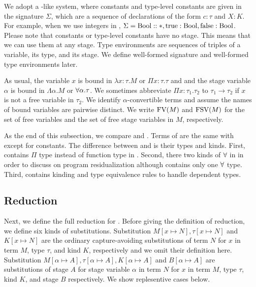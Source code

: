 
We adopt a \LLF-like system, where constants and type-level constants are given in the signature $\Sigma$, which
are a sequence of declarations of the form $c:\tau$ and $X:K$.
For example, when we use integers in \LMD, $\Sigma = \textrm{Bool} :: *, \textrm{true}:\textrm{Bool}, \textrm{false}:\textrm{Bool}$.
Please note that constants or type-level constants have no stage.
This means that we can use them at any stage.
Type environments are sequences of triples of a variable, its type, and its stage.
We define well-formed signature and well-formed type environments later.

As usual, the variable $x$ is bound in $\lambda x:\tau.M$ or $\Pi x:\tau.\tau$ and
and the stage variable $\alpha$ is bound in $\Lambda \alpha.M$ or $\forall\alpha.\tau$.
We sometimes abbreviate $\Pi x:\tau_1.\tau_2$ to $\tau_1 \rightarrow \tau_2$ if
$x$ is not a free variable in $\tau_2$.
We identify $\alpha$-convertible terms and assume the names of bound variables are pairwise distinct.
We write $\text{FV}(M)$ and $\text{FSV}(M)$ for the set of free variables and the set of free stage variables in $M$, respectively.



As the end of this subsection, we compare \LMD and \LTP.
Terms of \LMD are the same with \LTP except for constants.
The difference between \LMD and \LTP is their types and kinds.
First, \LMD contains $\Pi$ type instead of function type in \LTP.
Second, there two kinds of $\forall$ in \LTP in order to discuss on program residualization
although \LMD contains only one $\forall$ type.
Third, \LMD contains kinding and type equivalence rules to handle dependent types.

\subsection{Reduction}

Next, we define the full reduction for \LMD.
Before giving the definition of reduction, we define six kinds of substitutions.
Substitution $M[x\mapsto N], \tau[x \mapsto N]$ and $K[x \mapsto N]$ are
the ordinary capture-avoiding substitutions of
term $N$ for $x$ in term $M$, type $\tau$, and kind $K$, respectively
and we omit their definition here.
Substitution $M[\alpha \mapsto A], \tau [\alpha \mapsto A], K[\alpha \mapsto A]$ and $B[\alpha\mapsto A]$ are
substitutions of stage $A$ for stage variable $\alpha$ in
term $N$ for $x$ in term $M$, type $\tau$, kind $K$, and stage $B$ respectively.
We show replesentive cases below.

